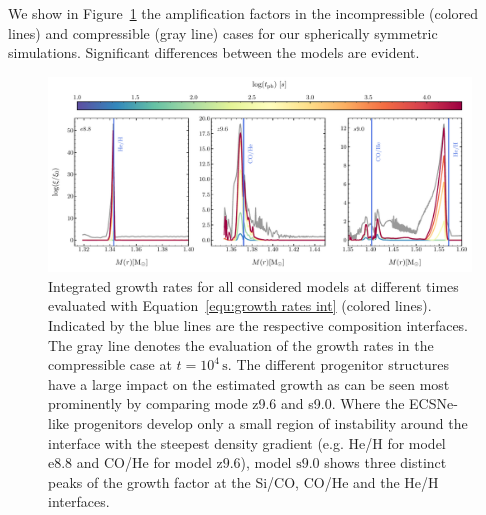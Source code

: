 \documentclass[fleqn,usenatbib]{mnras}
\newcommand{\onemg}{\ensuremath{\mathrm{e8.8}}\xspace}
\newcommand{\snine}{\ensuremath{\mathrm{s9.0}}\xspace}
\newcommand{\znine}{\ensuremath{\mathrm{z9.6}}\xspace}
\begin{document}
We show in Figure~\ref{fig:growth rates} the amplification factors in the incompressible (colored lines) and compressible (gray line) cases for our spherically symmetric simulations. Significant differences between the models are evident.
\begin{figure}
 \centering
 \includegraphics[width=\textwidth]{pic/growth_rates_1d_paper.pdf}
 \caption{Integrated growth rates for all considered models at different times evaluated with Equation~\ref{equ:growth rates int} (colored lines). Indicated by the blue lines are the respective composition interfaces. The gray line denotes the evaluation of the growth rates in the compressible case at $t=10^{4}\,\text{s}$. The different progenitor structures have a large impact on the estimated growth as can be seen most prominently by comparing mode z9.6 and s9.0. Where the ECSNe-like progenitors develop only a small region of instability around the interface with the steepest density gradient (e.g. He/H for model \onemg and CO/He for model \znine), model \snine shows three distinct peaks of the growth factor at the Si/CO, CO/He and the He/H interfaces. }
 \label{fig:growth rates}
\end{figure}
\end{document}
